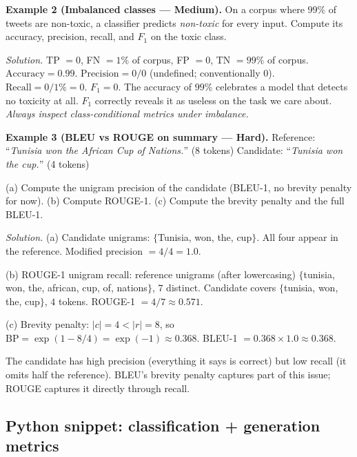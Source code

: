 \medskip

\textbf{Example 2 (Imbalanced classes --- Medium).}
On a corpus where $99\%$ of tweets are non-toxic, a classifier predicts \emph{non-toxic} for every input. Compute its accuracy, precision, recall, and $F_1$ on the toxic class.

\textit{Solution.} TP $= 0$, FN $= 1\%$ of corpus, FP $= 0$, TN $= 99\%$ of corpus.
$\mathrm{Accuracy} = 0.99$. $\mathrm{Precision} = 0/0$ (undefined; conventionally $0$). $\mathrm{Recall} = 0/1\% = 0$. $F_1 = 0$.
The accuracy of $99\%$ celebrates a model that detects no toxicity at all. $F_1$ correctly reveals it as useless on the task we care about. \emph{Always inspect class-conditional metrics under imbalance.}

\medskip

\textbf{Example 3 (BLEU vs ROUGE on summary --- Hard).}
Reference: ``\emph{Tunisia won the African Cup of Nations.}'' (8 tokens)
Candidate: ``\emph{Tunisia won the cup.}'' (4 tokens)

(a) Compute the unigram precision of the candidate (BLEU-1, no brevity penalty for now).
(b) Compute ROUGE-1.
(c) Compute the brevity penalty and the full BLEU-1.

\textit{Solution.}
(a) Candidate unigrams: $\{$Tunisia, won, the, cup$\}$. All four appear in the reference. Modified precision $= 4/4 = 1.0$.

(b) ROUGE-1 unigram recall: reference unigrams (after lowercasing) $\{$tunisia, won, the, african, cup, of, nations$\}$, $7$ distinct. Candidate covers $\{$tunisia, won, the, cup$\}$, $4$ tokens. ROUGE-1 $= 4/7 \approx 0.571$.

(c) Brevity penalty: $|c| = 4 < |r| = 8$, so $\mathrm{BP} = \exp(1 - 8/4) = \exp(-1) \approx 0.368$. BLEU-1 $= 0.368 \times 1.0 \approx 0.368$.

The candidate has high precision (everything it says is correct) but low recall (it omits half the reference). BLEU's brevity penalty captures part of this issue; ROUGE captures it directly through recall.

\subsection{Python snippet: classification + generation metrics}

